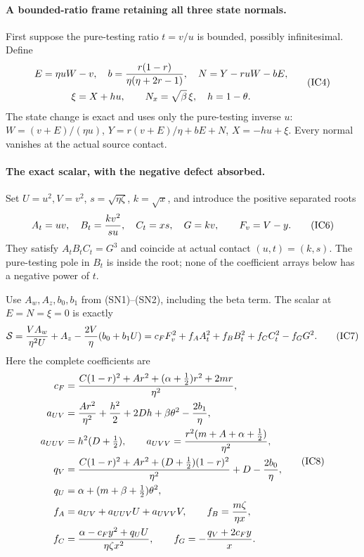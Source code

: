 \paragraph{A bounded-ratio frame retaining all three state normals.}
First suppose the pure-testing ratio $t=v/u$ is bounded, possibly
infinitesimal. Define
\[
 \begin{gathered}
 E=\eta uW-v,\quad
 b={r(1-r)\over\eta(\eta+2r-1)},\quad
 N=Y-ruW-bE,\\
 \xi=X+hu,\qquad N_x=\sqrt\beta\,\xi,\quad h=1-\theta.
                                                               \end{gathered} \tag{IC4}
\]
The state change is exact and uses only the pure-testing inverse $u$:
$W=(v+E)/(\eta u)$, $Y=r(v+E)/\eta+bE+N$, $X=-hu+\xi$.
Every normal vanishes at the actual source contact. 

\paragraph{The exact scalar, with the negative defect absorbed.}
Set $U=u^2,V=v^2$, $s=\sqrt{\eta\zeta}$, $k=\sqrt x$, and introduce
the positive separated roots
\[
 A_t=uv,\quad B_t={k v^2\over s u},\quad
 C_t=xs,\quad G=kv,\qquad F_v=V-y.
                                                               \tag{IC6}
\]
They satisfy $A_tB_tC_t=G^3$ and coincide at actual contact
$(u,t)=(k,s)$. The pure-testing pole in $B_t$ is inside the root;
none of the coefficient arrays below has a negative power of $t$.

Use $A_w,A_z,b_0,b_1$ from (SN1)--(SN2), including the beta term.
The scalar at $E=N=\xi=0$ is exactly
\[
 \mathcal S={VA_w\over\eta^2U}+A_z
                  -{2V\over\eta}(b_0+b_1U)
       =c_FF_v^2+f_AA_t^2+f_BB_t^2+f_CC_t^2-f_GG^2.    \tag{IC7}
\]
Here the complete coefficients are
\[
\begin{aligned}
 c_F={}&{C(1-r)^2+Ar^2+(\alpha+\tfrac12)r^2+2mr\over\eta^2},\\
 a_{UV}={}&{Ar^2\over\eta^2}+{h^2\over2}+2Dh+\beta\theta^2
                                     -{2b_1\over\eta},\\
 a_{UUV}={}&h^2(D+\tfrac12),\qquad
 a_{UVV}={r^2(m+A+\alpha+\tfrac12)\over\eta^2},\\
 q_V={}&{C(1-r)^2+Ar^2+(D+\tfrac12)(1-r)^2\over\eta^2}
                                     +D-{2b_0\over\eta},\\
 q_U={}&\alpha+(m+\beta+\tfrac12)\theta^2,\\
 f_A={}&a_{UV}+a_{UUV}U+a_{UVV}V,\qquad
 f_B={m\zeta\over\eta x},\\
 f_C={}&{\alpha-c_Fy^2+q_UU\over\eta\zeta x^2},\qquad
 f_G=-{q_V+2c_Fy\over x}.                              \end{aligned} \tag{IC8}
\]

